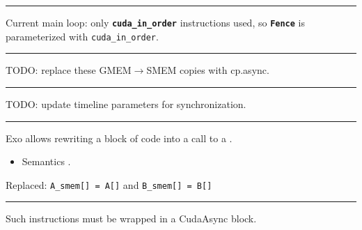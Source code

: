 {\large

}

\vspace{3mm}
\hrule

{\LARGE
Current main loop:
only \textbf{\texttt{cuda\_in\_order}} instructions used,
so \textbf{\texttt{Fence}} is parameterized with \texttt{cuda\_in\_order}.
}

\newpage
{}

{\large

}

\vspace{3mm}
\hrule

{\LARGE
TODO: replace these GMEM$\to$SMEM copies with cp.async.
}

\newpage
{}

{\large

}

\vspace{3mm}
\hrule

{\LARGE
TODO: update timeline parameters for synchronization.
}

\newpage
{}

{\large

}

\vspace{3mm}
\hrule

{\LARGE

Exo allows rewriting a block of code into a call to a .
\begin{itemize}
  \item Semantics .
\end{itemize}

Replaced: \texttt{A\_smem[] = A[]} and \texttt{B\_smem[] = B[]}

}

\newpage
{}

{\large

}

\vspace{3mm}
\hrule

{\LARGE

Such instructions must be wrapped in a CudaAsync block.

}

\newpage
{}

